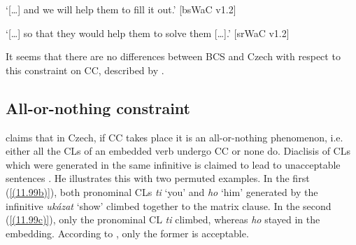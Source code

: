\begin{exe}\ex
\begin{xlist}
\end{xlist}
\glt ‘[\dots] and we will help them to fill it out.’
\hfill [bsWaC v1.2]

\ex
\begin{xlist}
\end{xlist}
\glt ‘[\dots] so that they would help them to solve them [\dots].’
\hfill [srWaC v1.2] 
\end{exe}

\noindent It seems that there are no differences between BCS and Czech with respect to this constraint on CC, described by \citet{Hana07}.

\subsection{All-or-nothing constraint}
\label{All-or-nothing constraint}

\citet[8]{Rezac05} claims that in Czech, if CC takes place it is an all-or-nothing phenomenon, i.e. either all the CLs of an embedded verb undergo CC or none do. Diaclisis of CLs which were generated in the same infinitive is claimed to lead to unacceptable sentences \citep[cf.][8]{Rezac05}. He illustrates this with two permuted examples. In the first (\ref{(11.99b)}), both pronominal CLs \textit{ti} ‘you’ and \textit{ho} ‘him’ generated by the infinitive \textit{ukázat} ‘show’ climbed together to the matrix clause. In the second (\ref{(11.99c)}), only the pronominal CL \textit{ti} climbed, whereas \textit{ho} stayed in the embedding. According to \citet[8]{Rezac05}, only the former is acceptable. 

